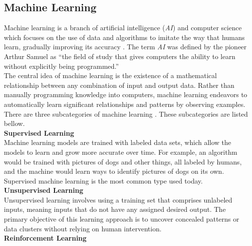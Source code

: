 \newpage

\subsection{Machine Learning}

Machine learning is a branch of artificial intelligence (\textit{AI}) and computer science which focuses on the use of data and algorithms to imitate the way that humans learn, gradually improving its accuracy \cite{IBMMachineLearning}. The term \textit{AI} was defined by the pioneer Arthur Samuel as “the field of study that gives computers the ability to learn without explicitly being programmed.” \\

The central idea of machine learning is the existence of a mathematical relationship between any combination of input and output data. Rather than manually programming knowledge into computers, machine learning endeavors to automatically learn significant relationships and patterns by observing examples. \\

There are three subcategories of machine learning \cite{MITML}. These subcategories are listed bellow. \\

\vspace{0.5cm}
\textbf{Supervised Learning} \\

Machine learning models are trained with labeled data sets, which allow the models to learn and grow more accurate over time. For example, an algorithm would be trained with pictures of dogs and other things, all labeled by humans, and the machine would learn ways to identify pictures of dogs on its own. Supervised machine learning is the most common type used today. \\

\vspace{0.5cm}
\textbf{Unsupervised Learning} \\

Unsupervised learning involves using a training set that comprises unlabeled inputs, meaning inputs that do not have any assigned desired output. The primary objective of this learning approach is to uncover concealed patterns or data clusters without relying on human intervention. \\

\vspace{0.5cm}
\textbf{Reinforcement Learning} \\


